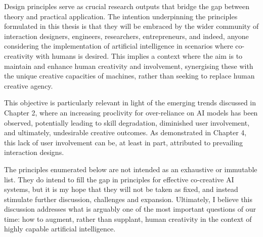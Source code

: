Design principles serve as crucial research outputs that bridge the gap between theory and practical application. The intention underpinning the principles formulated in this thesis is that they will be embraced by the wider community of interaction designers, engineers, researchers, entrepreneurs, and indeed, anyone considering the implementation of artificial intelligence in scenarios where co-creativity with humans is desired. This implies a context where the aim is to maintain and enhance human creativity and involvement, synergising these with the unique creative capacities of machines, rather than seeking to replace human creative agency.

This objective is particularly relevant in light of the emerging trends discussed in Chapter 2, where an increasing proclivity for over-reliance on AI models has been observed, potentially leading to skill degradation, diminished user involvement, and ultimately, undesirable creative outcomes. As demonstrated in Chapter 4, this lack of user involvement can be, at least in part, attributed to prevailing interaction designs.

The principles enumerated below are not intended as an exhaustive or immutable list. They do intend to fill the gap in principles for effective co-creative AI systems, but it is my hope that they will not be taken as fixed, and instead stimulate further discussion, challenges and expansion. Ultimately, I believe this discussion addresses what is arguably one of the most important questions of our time: how to augment, rather than supplant, human creativity in the context of highly capable artificial intelligence.



\renewcommand{\arraystretch}{1.4} %

